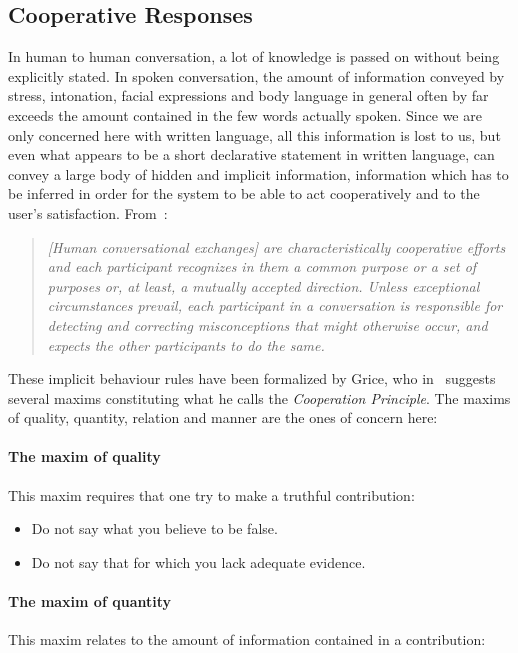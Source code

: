 \subsection{Cooperative Responses}
\label{coop}

In human to human conversation, a lot of knowledge is passed on
without being explicitly stated. In spoken conversation, the amount of
information conveyed by stress, intonation, facial expressions and
body language in general often by far exceeds the amount contained in
the few words actually spoken. Since we are only concerned here with
written language, all this information is lost to us, but even what
appears to be a short declarative statement in written language, can
convey a large body of hidden and implicit information, information
which has to be inferred in order for the system to be able to act
cooperatively and to the user's satisfaction.  From~\cite{gal}:

\begin{quote}
  {\em {\em [Human conversational exchanges]} are characteristically
  cooperative efforts and each participant recognizes in them a common
  purpose or a set of purposes or, at least, a mutually accepted
  direction. Unless exceptional circumstances prevail, each
  participant in a conversation is responsible for detecting and
  correcting misconceptions that might otherwise occur, and expects
  the other participants to do the same.}
\end{quote}

These implicit behaviour rules have been formalized by Grice, who
in~\cite{grice} suggests several maxims constituting what he calls the
{\em Cooperation Principle\/}. The maxims of quality, quantity,
relation and manner are the ones of concern here:

\paragraph{The maxim of quality} 
This maxim requires that one try to make a truthful contribution:

\begin{itemize}
  \item Do not say what you believe to be false.
  \item Do not say that for which you lack adequate evidence.
\end{itemize}

\paragraph{The maxim of quantity} 
This maxim relates to the amount of information contained in a
contribution:

